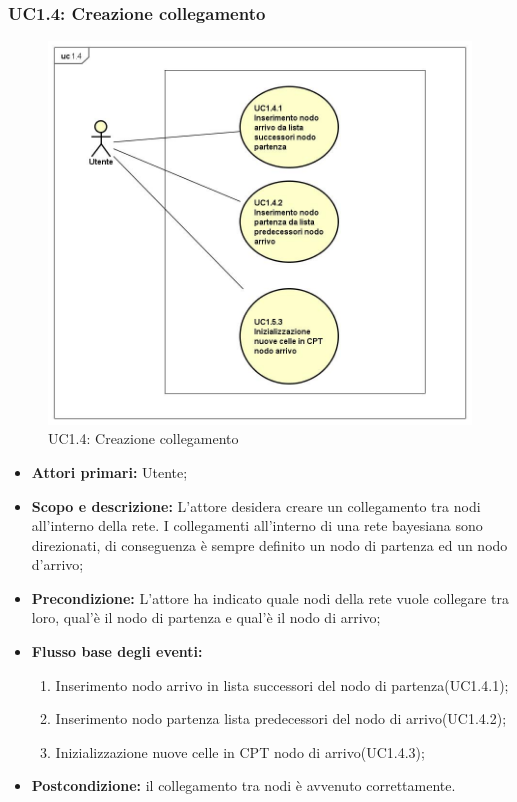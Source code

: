 \subsubsection{UC1.4: Creazione collegamento} 
\begin{figure} [H]
	\centering
	\includegraphics[scale=0.45]{Img/UC1-4} 
	\caption{UC1.4: Creazione collegamento} \label{} 
\end{figure} 
\begin{itemize} 
	\item{\textbf{Attori primari:} Utente;} 
	\item{\textbf{Scopo e descrizione:} L'attore desidera creare un collegamento tra nodi all'interno della rete. I collegamenti all'interno di una rete bayesiana sono direzionati, di conseguenza è sempre definito un nodo di partenza ed un nodo d'arrivo;} 
	\item{\textbf{Precondizione:} L'attore ha indicato quale nodi della rete vuole collegare tra loro, qual'è il nodo di partenza e qual'è il nodo di arrivo;} 
	\item{\textbf{Flusso base degli eventi:} } 
		\begin{enumerate} 
			\item{Inserimento nodo arrivo in lista successori del nodo di partenza(UC1.4.1);} 
			\item{Inserimento nodo partenza lista predecessori del nodo di arrivo(UC1.4.2);} 
			\item{Inizializzazione nuove celle in CPT nodo di arrivo(UC1.4.3);} 
		\end{enumerate} 
	\item{\textbf{Postcondizione:} il collegamento tra nodi è avvenuto correttamente.} 
\end{itemize} 
